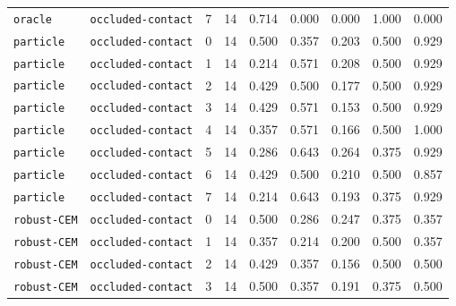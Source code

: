 \documentclass{article}
\begin{document}
\begin{center}
\begin{tabular}{llccccccc}
\texttt{oracle} & \texttt{occluded-contact} & 7 & 14 & 0.714 & 0.000 & 0.000 & 1.000 & 0.000 \\
\texttt{particle} & \texttt{occluded-contact} & 0 & 14 & 0.500 & 0.357 & 0.203 & 0.500 & 0.929 \\
\texttt{particle} & \texttt{occluded-contact} & 1 & 14 & 0.214 & 0.571 & 0.208 & 0.500 & 0.929 \\
\texttt{particle} & \texttt{occluded-contact} & 2 & 14 & 0.429 & 0.500 & 0.177 & 0.500 & 0.929 \\
\texttt{particle} & \texttt{occluded-contact} & 3 & 14 & 0.429 & 0.571 & 0.153 & 0.500 & 0.929 \\
\texttt{particle} & \texttt{occluded-contact} & 4 & 14 & 0.357 & 0.571 & 0.166 & 0.500 & 1.000 \\
\texttt{particle} & \texttt{occluded-contact} & 5 & 14 & 0.286 & 0.643 & 0.264 & 0.375 & 0.929 \\
\texttt{particle} & \texttt{occluded-contact} & 6 & 14 & 0.429 & 0.500 & 0.210 & 0.500 & 0.857 \\
\texttt{particle} & \texttt{occluded-contact} & 7 & 14 & 0.214 & 0.643 & 0.193 & 0.375 & 0.929 \\
\texttt{robust-CEM} & \texttt{occluded-contact} & 0 & 14 & 0.500 & 0.286 & 0.247 & 0.375 & 0.357 \\
\texttt{robust-CEM} & \texttt{occluded-contact} & 1 & 14 & 0.357 & 0.214 & 0.200 & 0.500 & 0.357 \\
\texttt{robust-CEM} & \texttt{occluded-contact} & 2 & 14 & 0.429 & 0.357 & 0.156 & 0.500 & 0.500 \\
\texttt{robust-CEM} & \texttt{occluded-contact} & 3 & 14 & 0.500 & 0.357 & 0.191 & 0.375 & 0.500 \\
\bottomrule
\end{tabular}
\end{center}
\end{document}
